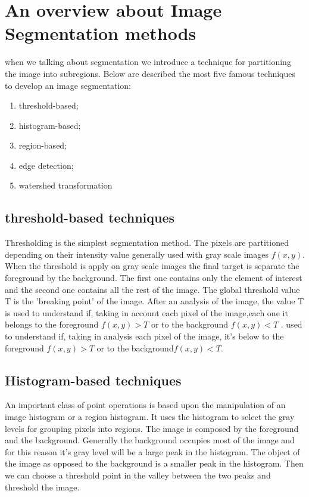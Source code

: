 \section{An overview about Image Segmentation methods}
when we talking about segmentation we introduce a technique for partitioning the image into subregions. Below are described the most five famous techniques to develop an image segmentation:
\begin{enumerate}
	\item threshold-based;
	\item histogram-based;
	\item region-based;
	\item edge detection;
	\item watershed transformation
\end{enumerate}
\subsection{threshold-based techniques}
Thresholding is the simplest segmentation method. The pixels are partitioned depending on their intensity value generally used with gray scale images $f(x,y)$. When the threshold is apply on gray scale images the final target is separate the foreground by the background. The first one contains only the element of interest and the second one contains all the rest of the image. The global threshold value T is the 'breaking point' of the image. After an analysis of the image, the value T is used to understand if, taking in account each pixel of the image,each one it belongs to the foreground $f(x, y) > T$ or to the background $f(x, y) < T$ . used to understand if, taking in analysis each pixel of the image, it's below to the foreground $f(x, y) > T$ or to the background$f(x, y) < T$.\cite{Threshold}

\subsection{Histogram-based techniques}
An important class of point operations is based upon the manipulation of an image histogram or a region histogram. It uses the histogram to select the gray levels for grouping pixels into regions. The image is composed by the foreground and the background. Generally the background occupies most of the image and for this reason it's gray level will be a large peak in the histogram. The object of the image as opposed to the background is a smaller peak in the histogram. Then we can choose a threshold point in the valley between the two peaks and threshold the image.

